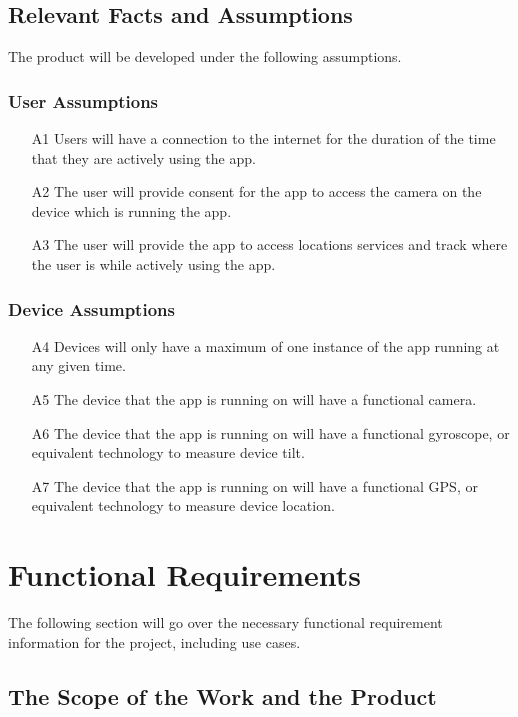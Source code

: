 \documentclass[12pt]{article}
\begin{document}
\subsection{Relevant Facts and Assumptions}
The product will be developed under the following assumptions.

\subsubsection{User Assumptions}
\begin{itemize}
    \item [A1] Users will have a connection to the internet for the duration of the time that they are actively using the app. 
    \item [A2] The user will provide consent for the app to access the camera on the device which is running the app. 
    \item [A3] The user will provide the app to access locations services and track where the user is while actively using the app. 
\end{itemize}

\subsubsection{Device Assumptions}
\begin{itemize}
    \item [A4] Devices will only have a maximum of one instance of the app running at any given time. 
    \item [A5] The device that the app is running on will have a functional camera. 
    \item [A6] The device that the app is running on will have a functional gyroscope, or equivalent technology to measure device tilt. 
    \item [A7] The device that the app is running on will have a functional GPS, or equivalent technology to measure device location. 
\end{itemize}

\section{Functional Requirements}
The following section will go over the necessary functional requirement information for the project, including use cases. 
\subsection{The Scope of the Work and the Product}
\end{document}
